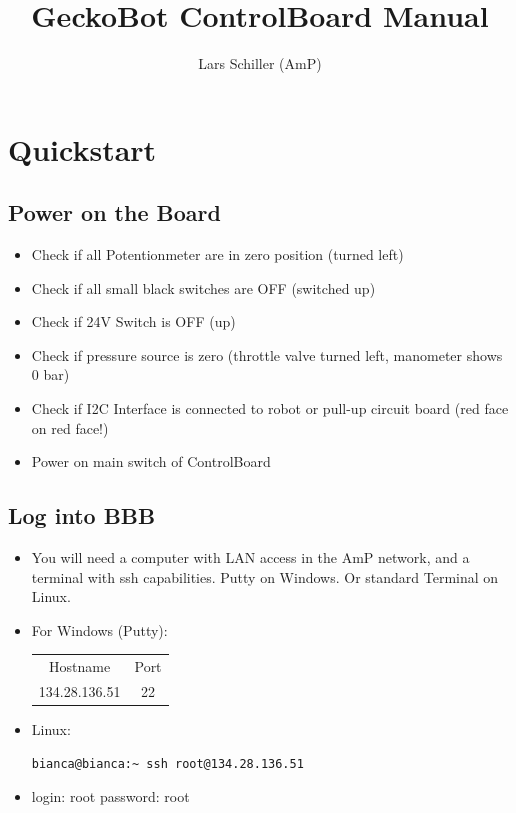 \documentclass[
	fontsize=10pt
	paper=a4
]{scrartcl}
\author{Lars Schiller (AmP)}
\title{GeckoBot ControlBoard Manual}
\begin{document}
\maketitle
\tableofcontents


\clearpage
\section{Quickstart}

\subsection{Power on the Board}

\begin{itemize}
\item Check if all Potentionmeter are in zero position (turned left)
\item Check if all small black switches are OFF (switched up)
\item Check if 24V Switch is OFF (up)
\item Check if pressure source is zero (throttle valve turned left, manometer shows 0 bar)
\item Check if I2C Interface is connected to robot or pull-up circuit board (red face on red face!)
\item Power on main switch of ControlBoard



\end{itemize}

\subsection{Log into BBB}

\begin{itemize}

\item 	You will need a computer with LAN access in the AmP network, and a terminal with ssh capabilities. Putty on Windows. Or standard Terminal on Linux.

\item For Windows (Putty):
\begin{tabular}{cc}
Hostname & Port \\
134.28.136.51 & 22 \\
\end{tabular}

\item Linux:
\begin{lstlisting}
bianca@bianca:~ ssh root@134.28.136.51
\end{lstlisting}

\item login: root \qquad password: root

\end{itemize}
\end{document}
